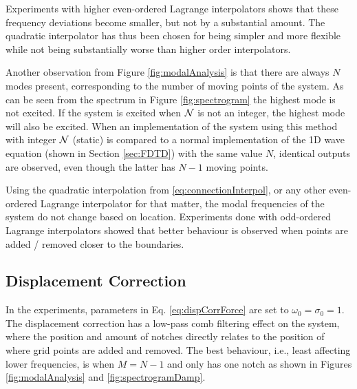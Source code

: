 Experiments with higher even-ordered Lagrange interpolators shows that these frequency deviations become smaller, but not by a substantial amount. The quadratic interpolator has thus been chosen for being simpler and more flexible while not being substantially worse than higher order interpolators.

Another observation from Figure \ref{fig:modalAnalysis} is that there are always $N$ modes present, corresponding to the number of moving points of the system. As can be seen from the spectrum in Figure \ref{fig:spectrogram} the highest mode is not excited. If the system is excited when $\mathcal{N}$ is not an integer, the highest mode will also be excited.
When an implementation of the system using this method with integer $\mathcal{N}$ (static) is compared to a normal implementation of the 1D wave equation (shown in Section \ref{sec:FDTD}) with the same value $N$, identical outputs are observed, even though the latter has $N-1$ moving points. \SWcomment[this confirms that \eqref{eq:totalSystem} reduces to the normal case when $\alpha = 0$]

Using the quadratic interpolation from \eqref{eq:connectionInterpol}, or any other even-ordered Lagrange interpolator for that matter, the modal frequencies of the system do not change based on location. Experiments done with odd-ordered Lagrange interpolators showed that better behaviour is observed when points are added / removed closer to the boundaries. 

\subsection{Displacement Correction}\label{sec:dispCorrRes}
In the experiments, parameters in Eq. \eqref{eq:dispCorrForce} are set to $\omega_0 = \sigma_0 = 1$. The displacement correction has a low-pass comb filtering effect on the system, where the position and amount of notches directly relates to the position of where grid points are added and removed. The best behaviour, i.e., least affecting lower frequencies, is when $M = N - 1$ and only has one notch as shown in Figures \ref{fig:modalAnalysis} and \ref{fig:spectrogramDamp}.

